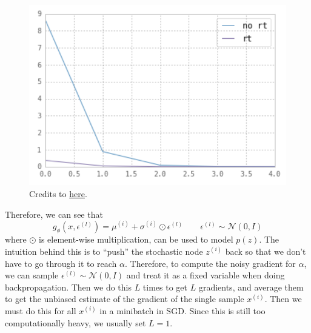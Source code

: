 \begin{example}[Gradient of Expection of $f(x) = x^2$ w.r.t. Gaussian]
    \begin{figure}[H]
      \centering 
      \includegraphics[scale=0.6]{img/reparam.png}
      \caption{Credits to \href{https://stats.stackexchange.com/questions/199605/how-does-the-reparameterization-trick-for-vaes-work-and-why-is-it-important}{here}.} 
      \label{fig:reparam}
    \end{figure}
  \end{example}

  Therefore, we can see that 
  \begin{equation}
    g_\phi (x, \epsilon^{(l)}) = \mu^{(i)} + \sigma^{(i)} \odot \epsilon^{(l)} \qquad \epsilon^{(l)} \sim \mathcal{N}(0, I)
  \end{equation}
  where $\odot$ is element-wise multiplication, can be used to model $p(z)$. The intuition behind this is to ``push'' the stochastic node $z^{(i)}$ back so that we don't have to go through it to reach $\alpha$. Therefore, to compute the noisy gradient for $\alpha$, we can sample $\epsilon^{(l)} \sim \mathcal{N}(0, I)$ and treat it as a fixed variable when doing backpropagation. Then we do this $L$ times to get $L$ gradients, and average them to get the unbiased estimate of the gradient of the single sample $x^{(i)}$. Then we must do this for all $x^{(i)}$ in a minibatch in SGD. Since this is still too computationally heavy, we usually set $L=1$. 

